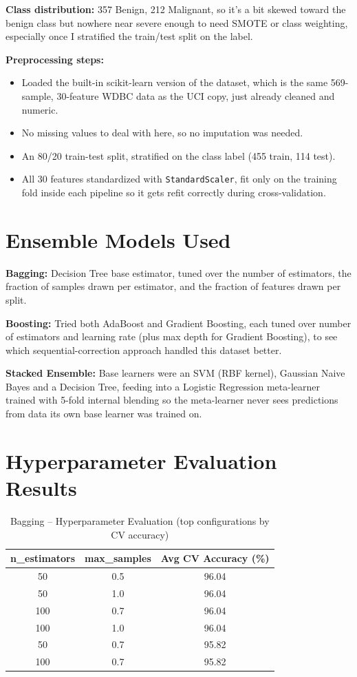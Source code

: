 \documentclass[12pt,a4paper]{article}
\begin{document}
\textbf{Class distribution:} 357 Benign, 212 Malignant, so it's a bit skewed toward the benign class
but nowhere near severe enough to need SMOTE or class weighting, especially once I stratified the
train/test split on the label.

\textbf{Preprocessing steps:}
\begin{itemize}
\item Loaded the built-in scikit-learn version of the dataset, which is the same 569-sample, 30-feature
WDBC data as the UCI copy, just already cleaned and numeric.
\item No missing values to deal with here, so no imputation was needed.
\item An 80/20 train-test split, stratified on the class label (455 train, 114 test).
\item All 30 features standardized with \texttt{StandardScaler}, fit only on the training fold inside
each pipeline so it gets refit correctly during cross-validation.
\end{itemize}

\section{Ensemble Models Used}

\textbf{Bagging:} Decision Tree base estimator, tuned over the number of estimators, the fraction of
samples drawn per estimator, and the fraction of features drawn per split.

\textbf{Boosting:} Tried both AdaBoost and Gradient Boosting, each tuned over number of estimators and
learning rate (plus max depth for Gradient Boosting), to see which sequential-correction approach
handled this dataset better.

\textbf{Stacked Ensemble:} Base learners were an SVM (RBF kernel), Gaussian Naive Bayes and a Decision
Tree, feeding into a Logistic Regression meta-learner trained with 5-fold internal blending so the
meta-learner never sees predictions from data its own base learner was trained on.

\section{Hyperparameter Evaluation Results}

\begin{table}[H]
\centering
\caption{Bagging -- Hyperparameter Evaluation (top configurations by CV accuracy)}
\begin{tabular}{ccc}
\toprule
n\_estimators & max\_samples & Avg CV Accuracy (\%) \\
\midrule
50 & 0.5 & 96.04 \\
50 & 1.0 & 96.04 \\
100 & 0.7 & 96.04 \\
100 & 1.0 & 96.04 \\
50 & 0.7 & 95.82 \\
100 & 0.7 & 95.82 \\
\bottomrule
\end{tabular}
\end{table}
\end{document}
